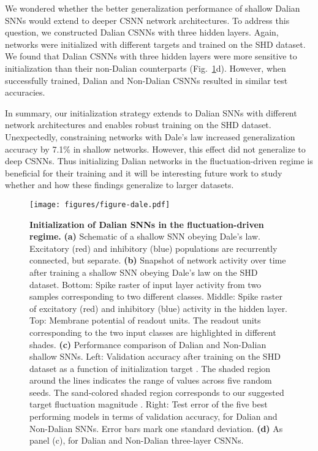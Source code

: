 \documentclass[11pt,a4paper]{article}
\begin{document}
We wondered whether the better generalization performance of shallow Dalian \acp{SNN} would extend to deeper \ac{CSNN} network architectures. 
To address this question, we constructed Dalian \acp{CSNN} with three hidden layers. 
Again, networks were initialized with different targets  and trained on the SHD dataset.
We found that Dalian \acp{CSNN} with three hidden layers were more sensitive to initialization than their non-Dalian counterparts (Fig.~\ref{fig:dale}d).
However, when successfully trained, Dalian and Non-Dalian \acp{CSNN} resulted in similar test accuracies. 

In summary, our initialization strategy extends to Dalian \acp{SNN} with different network architectures and enables robust training on the SHD dataset.
Unexpectedly, constraining networks with Dale's law increased generalization accuracy by 7.1\% in shallow networks. 
However, this effect did not generalize to deep \acp{CSNN}. 
Thus initializing Dalian networks in the fluctuation-driven regime is beneficial for their training and it will be interesting future work to study whether and how these findings generalize to larger datasets.

\begin{figure}[bt]
    \centering
    \texttt{[image: figures/figure-dale.pdf]}
    \caption{\textbf{Initialization of Dalian \acp{SNN} in the fluctuation-driven regime.} 
    \textbf{(a)} Schematic of a shallow \ac{SNN} obeying Dale's law. 
    Excitatory (red) and inhibitory (blue) populations are recurrently connected, but separate. 
    \textbf{(b)} Snapshot of network activity over time after training a shallow \ac{SNN} obeying Dale's law on the SHD dataset. 
    Bottom: Spike raster of input layer activity from two samples corresponding to two different classes.
    Middle: Spike raster of excitatory (red) and inhibitory (blue) activity in the hidden layer.
    Top: Membrane potential of readout units. The readout units corresponding to the two input classes are highlighted in different shades.
    \textbf{(c)} Performance comparison of Dalian and Non-Dalian shallow \acp{SNN}. 
    Left: Validation accuracy after training on the SHD dataset as a function of initialization target . The shaded region around the lines indicates the range of values across five random seeds. The sand-colored shaded region corresponds to our suggested target fluctuation magnitude .
    Right: Test error of the five best performing models in terms of validation accuracy, for Dalian and Non-Dalian \acp{SNN}. 
    Error bars mark  one standard deviation.
    \textbf{(d)} As panel (c), for Dalian and Non-Dalian three-layer \acp{CSNN}.
    }
    \label{fig:dale}
\end{figure}
\end{document}
